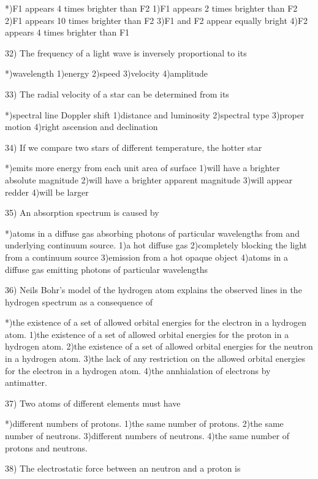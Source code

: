  *)F1 appears 4 times brighter than F2
 1)F1 appears 2 times brighter than F2
 2)F1 appears 10 times brighter than F2
 3)F1 and F2 appear equally bright
 4)F2 appears 4 times brighter than F1
 
32) The frequency of a light wave is inversely proportional to its
 
 *)wavelength
 1)energy
 2)speed
 3)velocity
 4)amplitude
 
33) The radial velocity of a star can be determined from its
 
 *)spectral line Doppler shift                                       
 1)distance and luminosity                                           
 2)spectral type                                                     
 3)proper motion                                                     
 4)right ascension and declination
 
34) If we compare two stars of different temperature, the hotter star
 
 *)emits more energy from each unit area of surface
 1)will have a brighter absolute magnitude
 2)will have a brighter apparent magnitude
 3)will appear redder
 4)will be larger
 
35) An absorption spectrum is caused by 
 
 *)atoms in a diffuse gas absorbing photons of particular wavelengths from
   and underlying continuum source.
 1)a hot diffuse gas
 2)completely blocking the light from a continuum source
 3)emission from a hot opaque object
 4)atoms in a diffuse gas emitting photons of particular wavelengths
 
36) Neils Bohr's model of the hydrogen atom explains the observed lines
    in the hydrogen spectrum as a consequence of 
 
 *)the existence of a set of allowed orbital energies for the electron
   in a hydrogen atom.
 1)the existence of a set of allowed orbital energies for the proton in
   a hydrogen atom.
 2)the existence of a set of allowed orbital energies for the neutron in
   a hydrogen atom.
 3)the lack of any restriction on the allowed orbital energies for the
   electron in a hydrogen atom.
 4)the annhialation of electrons by antimatter.
 
37) Two atoms of different elements must have
 
 *)different numbers of protons.
 1)the same number of protons.
 2)the same number of neutrons.
 3)different numbers of neutrons.
 4)the same number of protons and neutrons.
 
38) The electrostatic force between an neutron and a proton is
 
